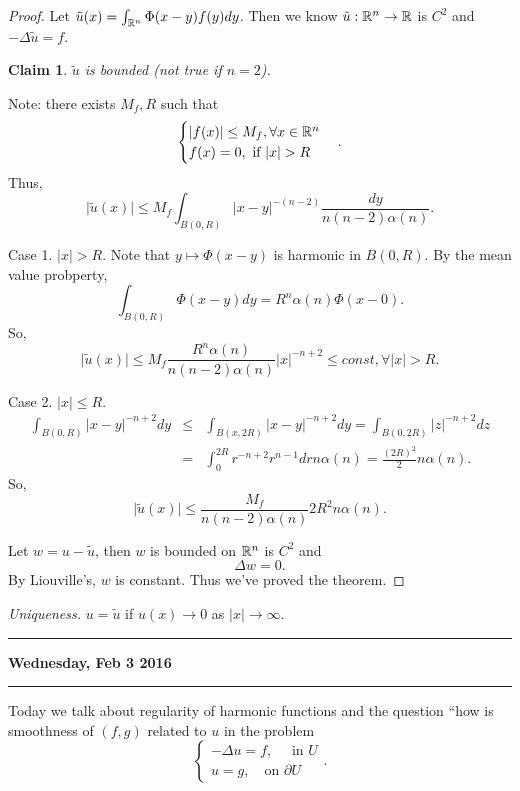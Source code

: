\documentclass[11pt]{amsart}%
\newtheorem*{claim}{Claim}
\begin{document}
\begin{proof}
    Let $\tilde{u}(x)=\int_{\mathbb{R}^n} \Phi(x-y)f(y)dy$. Then we know $\tilde{u}:\mathbb{R}^n\to \mathbb{R}$ is $C^2$ and $-\Delta\tilde{u}=f$.
    
    \begin{claim}
        $\tilde{u}$ is bounded (not true if $n=2$).
    \end{claim}
    Note: there exists $M_f, R$ such that
    $$\begin{cases}
        \vert f(x)\vert \le M_f, \forall x\in \mathbb{R}^n\\
        f(x)=0, \text{ if } \vert x\vert >R
    \end{cases}.$$
    Thus,
    $$\vert \tilde{u}(x)\vert \le M_f\int_{B(0,R)} \vert x-y\vert^{-(n-2)} \frac{dy}{n(n-2)\alpha(n)}.$$
    
    Case 1. $\vert x\vert >R$. Note that $y\mapsto \Phi(x-y)$ is harmonic in $B(0,R)$. By the mean value probperty,
    $$\int_{B(0,R)} \Phi(x-y)dy = R^n\alpha(n)\Phi(x-0).$$ So, $$\vert \tilde{u}(x)\vert \le M_f\frac{R^n\alpha(n)}{n(n-2)\alpha(n)}\vert x\vert^{-n+2}\le const, \forall \vert x\vert >R.$$
    
    Case 2. $\vert x\vert \le R$.
    \begin{eqnarray*}
        \int_{B(0,R)}\vert x-y\vert^{-n+2} dy &\le& \int_{B(x,2R)} \vert x-y\vert^{-n+2}dy =\int_{B(0,2R)}\vert z\vert^{-n+2} dz\\
        &=& \int_0^{2R} r^{-n+2}r^{n-1}dr n\alpha(n) = \frac{(2R)^2}{2}n\alpha(n).
    \end{eqnarray*}
    So, $$\vert \tilde{u}(x)\vert \le \frac{M_f}{n(n-2)\alpha(n)} 2R^2n\alpha(n).$$
    
    Let $w=u-\tilde{u}$, then $w$ is bounded on $\mathbb{R}^n$ is $C^2$ and
    $$\Delta w =0.$$
    By Liouville's, $w$ is constant. Thus we've proved the theorem.
\end{proof}

\emph{Uniqueness.} $u=\tilde{u}$ if $u(x)\to 0$ as $\vert x\vert \to \infty$.

\begin{center}\rule{0.5\linewidth}{\linethickness}\end{center}

\textbf{Wednesday, Feb 3 2016}

\begin{center}\rule{0.5\linewidth}{\linethickness}\end{center}
Today we talk about regularity of harmonic functions and the question ``how is smoothness of $(f,g)$ related to $u$ in the problem
$$\begin{cases}
    -\Delta u=f, \quad \text{ in $U$}\\
    u=g, \quad \text{on $\partial U$}
\end{cases}.$$
\end{document}
